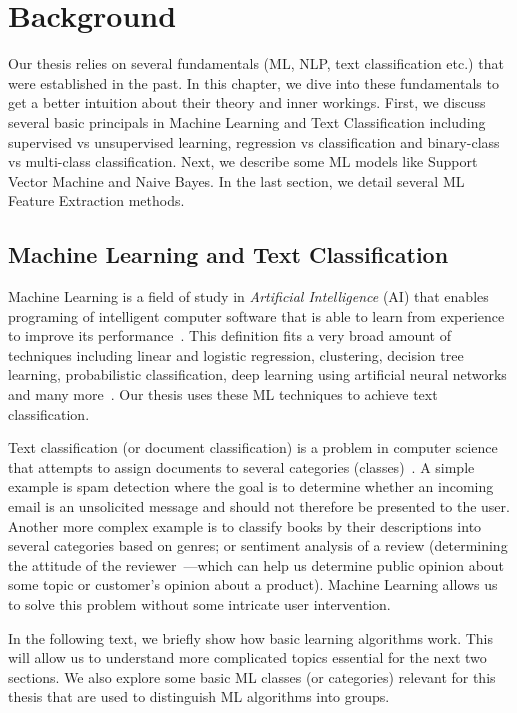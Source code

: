 \chapter{Background}
\label{chapter:background}

Our thesis relies on several fundamentals (ML, NLP, text classification etc.) that were established in the past. In this chapter, we dive into these fundamentals to get a better intuition about their theory and inner workings. First, we discuss several basic principals in Machine Learning and Text Classification including supervised vs unsupervised learning, regression vs classification and binary-class vs multi-class classification. Next, we describe some ML models like Support Vector Machine and Naive Bayes. In the last section, we detail several ML Feature Extraction methods.

\section{Machine Learning and Text Classification}

Machine Learning is a field of study in \textit{Artificial Intelligence} (AI) that enables programing of intelligent computer software that is able to learn from experience to improve its performance~\cite{Samuel1959}. This definition fits a very broad amount of techniques including linear and logistic regression, clustering, decision tree learning, probabilistic classification, deep learning using artificial neural networks and many more~\cite{bishop2006pattern}. Our thesis uses these ML techniques to achieve text classification.

Text classification (or document classification) is a problem in computer science that attempts to assign documents to several categories (classes)~\cite{Anvik2006}. A simple example is spam detection where the goal is to determine whether an incoming email is an unsolicited message and should not therefore be presented to the user. Another more complex example is to classify books by their descriptions into several categories based on genres; or sentiment analysis of a review (determining the attitude of the reviewer~\cite{pang2008sentiment}---which can help us determine public opinion about some topic or customer's opinion about a product). Machine Learning allows us to solve this problem without some intricate user intervention.

In the following text, we briefly show how basic learning algorithms work. This will allow us to understand more complicated topics essential for the next two sections. We also explore some basic ML classes (or categories) relevant for this thesis that are used to distinguish ML algorithms into groups.

